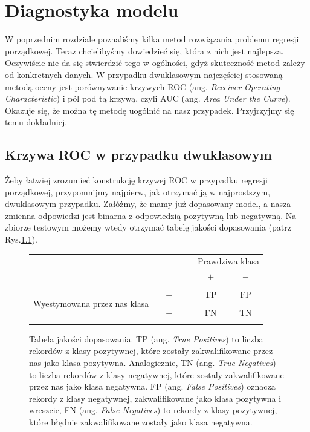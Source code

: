 \documentclass{mini}
\begin{document}

\chapter{Diagnostyka modelu}

W poprzednim rozdziale poznaliśmy kilka metod rozwiązania problemu regresji porządkowej. Teraz chcielibyśmy dowiedzieć się, która z nich jest najlepsza. Oczywiście nie da się stwierdzić tego w ogólności, gdyż skuteczność metod zależy od konkretnych danych. W przypadku dwuklasowym najczęściej stosowaną metodą oceny jest porównywanie krzywych ROC (ang. \textit{Receiver Operating Characteristic}) i pól pod tą krzywą, czyli AUC (ang. \textit{Area Under the Curve}). Okazuje się, że można tę metodę uogólnić na nasz przypadek. Przyjrzyjmy się temu dokładniej. 

\section{Krzywa ROC w przypadku dwuklasowym}


Żeby łatwiej zrozumieć konstrukcję krzywej ROC w przypadku regresji porządkowej, przypomnijmy najpierw, jak otrzymać ją w najprostszym, dwuklasowym przypadku. Załóżmy, że mamy już dopasowany model, a nasza zmienna odpowiedzi jest binarna z odpowiedzią pozytywną lub negatywną. Na zbiorze testowym możemy wtedy otrzymać tabelę jakości dopasowania (patrz Rys.\ref{tabeladopasowania}).

\begin{figure}[h]
		\begin{center}
		\begin{tabular}{c c c c | | c c c} 
			& & & & & \multicolumn{2}{c}{ Prawdziwa klasa}\\ 
			& & & & & $+$ & $-$ \\
			\hline
			\hline
			& & & & & & \\
			\multirow{3}{*}{\parbox{4cm}{\centering  Wyestymowana przez nas klasa}}
			& & $+$ & & & TP & FP\\
			& & & & &\\
			& & $-$ & & & FN & TN\\
			& & & & & &
		\end{tabular}
		\end{center}
	\caption{Tabela jakości dopasowania. TP (ang. \textit{True Positives}) to liczba rekordów z klasy pozytywnej, które zostały zakwalifikowane przez nas jako klasa pozytywna. Analogicznie, TN (ang. \textit{True Negatives}) to liczba rekordów z klasy negatywnej, które zostaly zakwalifikowane przez nas jako klasa negatywna. FP (ang. \textit{False Positives}) oznacza rekordy z klasy negatywnej, zakwalifikowane jako klasa pozytywna i wreszcie, FN (ang. \textit{False Negatives}) to rekordy z klasy pozytywnej, które błędnie zakwalifikowane zostały jako klasa negatywna.}
\label{tabeladopasowania}	
\end{figure}
\newpage
\vfill
\end{document}
